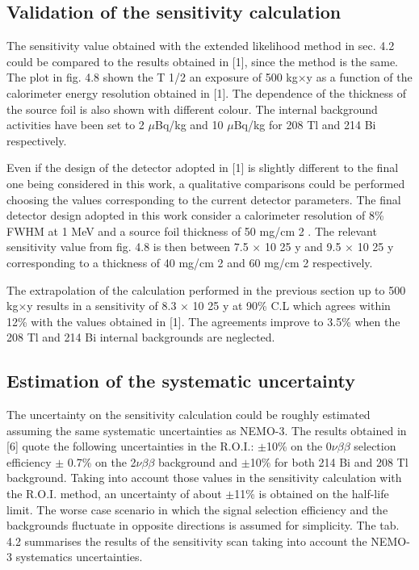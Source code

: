 \documentclass[main.tex]{subfiles}
\begin{document}
\subsection{Validation of the sensitivity calculation}


\NI The sensitivity value obtained with the extended likelihood method in sec. 4.2 could be compared to the results obtained in [1], since the method is the same. The plot in fig. 4.8 shown the T 1/2 an exposure of 500 kg$\times$y as a function of the calorimeter energy resolution obtained in [1]. The dependence of the thickness of the source foil is also shown with different colour. The internal background activities have been set to 2 $\mu$Bq/kg and 10 $\mu$Bq/kg for 208 Tl and 214 Bi respectively.


\bigskip


\NI Even if the design of the detector adopted in [1] is slightly different to the final one being considered in this work, a qualitative comparisons could be performed choosing the values corresponding to the current detector parameters. The final detector design adopted in this work consider a calorimeter resolution of 8\% FWHM at 1 MeV and a source foil thickness of 50 mg/cm 2 . The relevant sensitivity value from fig. 4.8 is then between 7.5 $\times$ 10 25 y and 9.5 $\times$ 10 25 y corresponding to a thickness of 40 mg/cm 2 and 60 mg/cm 2 respectively.


\bigskip


\NI The extrapolation of the calculation performed in the previous section up to 500 kg$\times$y results in a sensitivity of 8.3 $\times$ 10 25 y at 90\% C.L which agrees within 12\% with the values obtained in [1]. The agreements improve to 3.5\% when the 208 Tl and 214 Bi internal backgrounds are neglected.


\subsection{Estimation of the systematic uncertainty}


\NI The uncertainty on the sensitivity calculation could be roughly estimated assuming the same systematic uncertainties as NEMO-3. The results obtained in [6] quote the following uncertainties in the R.O.I.: $\pm$10\% on the 0$\nu\beta\beta$ selection efficiency $\pm$ 0.7\% on the 2$\nu\beta\beta$ background and $\pm$10\% for both 214 Bi and 208 Tl background. Taking into account those values in the sensitivity calculation with the R.O.I. method, an uncertainty of about $\pm$11\% is obtained on the half-life limit. The worse case scenario in which the signal selection efficiency and the backgrounds fluctuate in opposite directions is assumed for simplicity. The tab. 4.2 summarises the results of the sensitivity scan taking into account the NEMO-3 systematics uncertainties.
\end{document}
